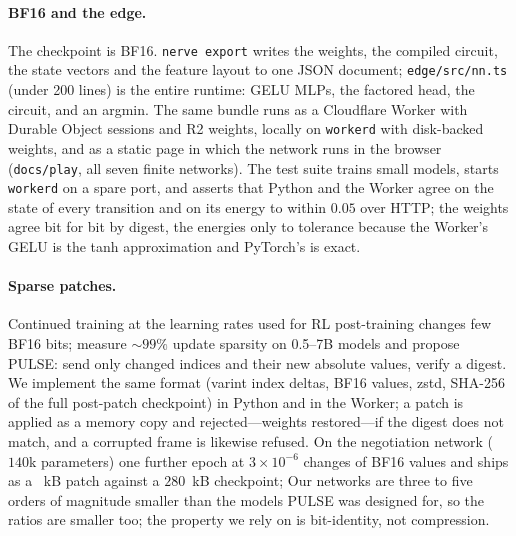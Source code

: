 \documentclass{article}
\theoremstyle{plain}
\theoremstyle{definition}
\theoremstyle{remark}
\begin{document}
\paragraph{BF16 and the edge.} The checkpoint is BF16. \texttt{nerve export} writes the weights, the compiled circuit, the state vectors and the feature layout to one JSON document; \texttt{edge/src/nn.ts} (under 200 lines) is the entire runtime: GELU MLPs, the factored head, the circuit, and an argmin. The same bundle runs as a Cloudflare Worker with Durable Object sessions and R2 weights, locally on \texttt{workerd} with disk-backed weights, and as a static page in which the network runs in the browser (\texttt{docs/play}, all seven finite networks). The test suite trains small models, starts \texttt{workerd} on a spare port, and asserts that Python and the Worker agree on the state of every transition and on its energy to within $0.05$ over HTTP; the weights agree bit for bit by digest, the energies only to tolerance because the Worker's GELU is the tanh approximation and PyTorch's is exact.

\paragraph{Sparse patches.} Continued training at the learning rates used for RL post-training changes few BF16 bits; \citet{miahi2026pulse} measure $\sim$$99\%$ update sparsity on 0.5--7B models and propose PULSE: send only changed indices and their new absolute values, verify a digest. We implement the same format (varint index deltas, BF16 values, zstd, SHA-256 of the full post-patch checkpoint) in Python and in the Worker; a patch is applied as a memory copy and rejected---weights restored---if the digest does not match, and a corrupted frame is likewise refused. On the negotiation network ($140$k parameters) one further epoch at $3\times10^{-6}$ changes \pulseonesparsity{} of BF16 values and ships as a \pulseonekb{}~kB patch against a $280$~kB checkpoint; \pulsesummary{} Our networks are three to five orders of magnitude smaller than the models PULSE was designed for, so the ratios are smaller too; the property we rely on is bit-identity, not compression.
\end{document}

